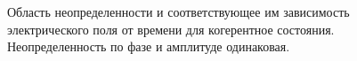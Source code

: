\begin{figure}
\centering



\caption{Область неопределенности и соответствующее им зависимость
  электрического поля от времени для когерентное
  состояния. Неопределенность по фазе и амплитуде одинаковая.}
\label{figPart3Squeezed_1}
\end{figure}
